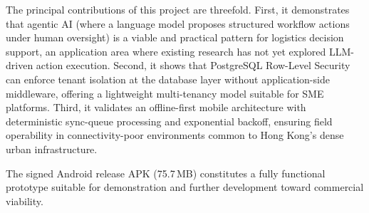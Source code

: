 The principal contributions of this project are threefold.  First, it
demonstrates that agentic AI (where a language model proposes structured
workflow actions under human oversight) is a viable and practical pattern
for logistics decision support, an application area where existing research
has not yet explored LLM-driven action execution.  Second, it shows that
PostgreSQL Row-Level Security can enforce tenant isolation at the database
layer without application-side middleware, offering a lightweight
multi-tenancy model suitable for SME platforms.  Third, it validates an
offline-first mobile architecture with deterministic sync-queue processing
and exponential backoff, ensuring field operability in connectivity-poor
environments common to Hong Kong's dense urban infrastructure.

The signed Android release APK (75.7\,MB) constitutes a fully functional
prototype suitable for demonstration and further development toward
commercial viability.

\newpage

